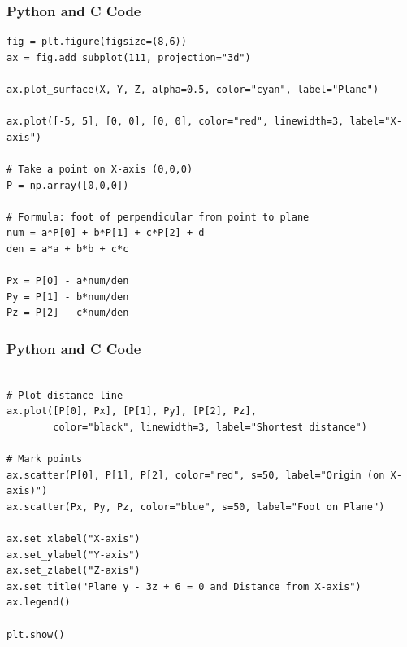 \documentclass{beamer}
\begin{document}
\begin{frame}[fragile]
\frametitle{Python and C Code}

\begin{lstlisting}
fig = plt.figure(figsize=(8,6))
ax = fig.add_subplot(111, projection="3d")

ax.plot_surface(X, Y, Z, alpha=0.5, color="cyan", label="Plane")

ax.plot([-5, 5], [0, 0], [0, 0], color="red", linewidth=3, label="X-axis")

# Take a point on X-axis (0,0,0)
P = np.array([0,0,0])

# Formula: foot of perpendicular from point to plane
num = a*P[0] + b*P[1] + c*P[2] + d
den = a*a + b*b + c*c

Px = P[0] - a*num/den
Py = P[1] - b*num/den
Pz = P[2] - c*num/den
\end{lstlisting}

\end{frame}

\begin{frame}[fragile]
\frametitle{Python and C Code}

\begin{lstlisting}

# Plot distance line
ax.plot([P[0], Px], [P[1], Py], [P[2], Pz],
        color="black", linewidth=3, label="Shortest distance")

# Mark points
ax.scatter(P[0], P[1], P[2], color="red", s=50, label="Origin (on X-axis)")
ax.scatter(Px, Py, Pz, color="blue", s=50, label="Foot on Plane")

ax.set_xlabel("X-axis")
ax.set_ylabel("Y-axis")
ax.set_zlabel("Z-axis")
ax.set_title("Plane y - 3z + 6 = 0 and Distance from X-axis")
ax.legend()

plt.show()
\end{lstlisting}

\end{frame}
\end{document}
